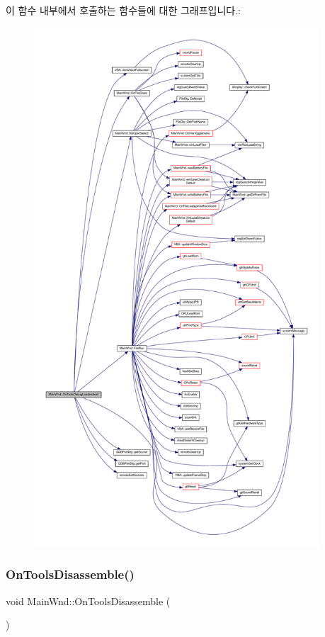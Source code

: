 이 함수 내부에서 호출하는 함수들에 대한 그래프입니다.\+:
\nopagebreak
\begin{figure}[H]
\begin{center}
\leavevmode
\includegraphics[height=550pt]{class_main_wnd_a9a253419b0bc7b8b246b68fcaefc1668_cgraph}
\end{center}
\end{figure}
\mbox{\label{class_main_wnd_a9344948fd01b5295707700e2ba4eaee4}} 
\subsubsection{\texorpdfstring{On\+Tools\+Disassemble()}{OnToolsDisassemble()}}
{\footnotesize\ttfamily void Main\+Wnd\+::\+On\+Tools\+Disassemble (\begin{DoxyParamCaption}{ }\end{DoxyParamCaption})\hspace{0.3cm}{\ttfamily [protected]}}



